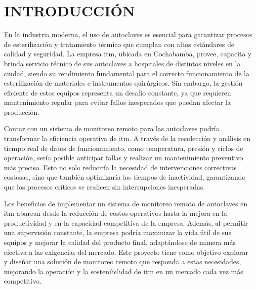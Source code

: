 \newpage
{} 

%
%

\section*{INTRODUCCIÓN}
En la industria moderna, el uso de autoclaves es esencial para garantizar procesos de esterilización y tratamiento térmico que cumplan con altos estándares de calidad y seguridad. La empresa \acrfull{itm}, ubicada en Cochabamba, provee, capacita y brinda servicio técnico de sus autoclaves a hospitales de distintos niveles en la ciudad, siendo su rendimiento fundamental para el correcto funcionamiento de la esterilización de materiales e instrumentos quirúrgicos. Sin embargo, la gestión eficiente de estos equipos representa un desafío constante, ya que requieren mantenimiento regular para evitar fallos inesperados que puedan afectar la producción.

Contar con un sistema de monitoreo remoto para las autoclaves podría transformar la eficiencia operativa de \acrshort{itm}. A través de la recolección y análisis en tiempo real de datos de funcionamiento, como temperatura, presión y ciclos de operación, sería posible anticipar fallas y realizar un mantenimiento preventivo más preciso. Esto no solo reduciría la necesidad de intervenciones correctivas costosas, sino que también optimizaría los tiempos de inactividad, garantizando que los procesos críticos se realicen sin interrupciones inesperadas.

Los beneficios de implementar un sistema de monitoreo remoto de autoclaves en \acrshort{itm} abarcan desde la reducción de costos operativos hasta la mejora en la productividad y en la capacidad competitiva de la empresa. Además, al permitir una supervisión constante, la empresa podría maximizar la vida útil de sus equipos y mejorar la calidad del producto final, adaptándose de manera más efectiva a las exigencias del mercado. Este proyecto tiene como objetivo explorar y diseñar una solución de monitoreo remoto que responda a estas necesidades, mejorando la operación y la sostenibilidad de \acrshort{itm} en un mercado cada vez más competitivo.

